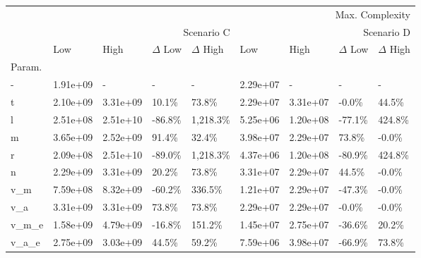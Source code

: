 \begin{tabular}{lllllllll}
\toprule
 & \multicolumn{8}{r}{Max. Complexity} \\
 & \multicolumn{4}{r}{Scenario C} & \multicolumn{4}{r}{Scenario D} \\
 & Low & High & $\Delta$ Low & $\Delta$ High & Low & High & $\Delta$ Low & $\Delta$ High \\
Param. &  &  &  &  &  &  &  &  \\
\midrule
- & 1.91e+09 & - & - & - & 2.29e+07 & - & - & - \\
t & 2.10e+09 & 3.31e+09 & 10.1\% & 73.8\% & 2.29e+07 & 3.31e+07 & -0.0\% & 44.5\% \\
l & 2.51e+08 & 2.51e+10 & -86.8\% & 1,218.3\% & 5.25e+06 & 1.20e+08 & -77.1\% & 424.8\% \\
m & 3.65e+09 & 2.52e+09 & 91.4\% & 32.4\% & 3.98e+07 & 2.29e+07 & 73.8\% & -0.0\% \\
r & 2.09e+08 & 2.51e+10 & -89.0\% & 1,218.3\% & 4.37e+06 & 1.20e+08 & -80.9\% & 424.8\% \\
n & 2.29e+09 & 3.31e+09 & 20.2\% & 73.8\% & 3.31e+07 & 2.29e+07 & 44.5\% & -0.0\% \\
v\_m & 7.59e+08 & 8.32e+09 & -60.2\% & 336.5\% & 1.21e+07 & 2.29e+07 & -47.3\% & -0.0\% \\
v\_a & 3.31e+09 & 3.31e+09 & 73.8\% & 73.8\% & 2.29e+07 & 2.29e+07 & -0.0\% & -0.0\% \\
v\_m\_e & 1.58e+09 & 4.79e+09 & -16.8\% & 151.2\% & 1.45e+07 & 2.75e+07 & -36.6\% & 20.2\% \\
v\_a\_e & 2.75e+09 & 3.03e+09 & 44.5\% & 59.2\% & 7.59e+06 & 3.98e+07 & -66.9\% & 73.8\% \\
\bottomrule
\end{tabular}

